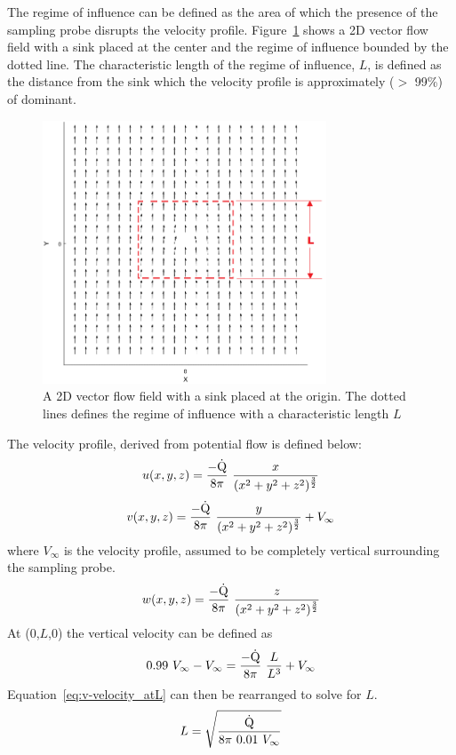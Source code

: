 \documentclass[12pt]{article}
\begin{document}
The regime of influence can be defined as the area of which the presence of the sampling probe disrupts the velocity profile. Figure~\ref{fig:Potential Flow} shows a 2D vector flow field with a sink placed at the center and the regime of influence bounded by the dotted line. The characteristic length of the regime of influence, $L$, is defined as the distance from the sink which the velocity profile is approximately ($>$ 99\%) of dominant.
\begin{figure}[h!]
	\centering
\includegraphics[width=8.45cm,keepaspectratio]{Potential_Flow.png}
	\caption{A 2D vector flow field with a sink placed at the origin. The dotted lines defines the regime of influence with a characteristic length $L$}
	\label{fig:Potential Flow}
\end{figure}

The velocity profile, derived from potential flow is defined below:
\begin{equation}
\label{eq:u-velocity}
u(x,y,z)=\frac{-\rm{\dot{Q}}}{8\pi}~\frac{x}{({x^2+y^2+z^2})^{\frac{3}{2}}}
\end{equation}
\begin{equation}
\label{eq:v-velocity}
v(x,y,z)=\frac{-\rm{\dot{Q}}}{8\pi}~\frac{y}{({x^2+y^2+z^2})^{\frac{3}{2}}}+V_{\infty}
\end{equation}
where $V_{\infty}$ is the velocity profile, assumed to be completely vertical surrounding the sampling probe. 
\begin{equation}
\label{eq:w-velocity}
w(x,y,z)=\frac{-\rm{\dot{Q}}}{8\pi}~\frac{z}{({x^2+y^2+z^2})^{\frac{3}{2}}}
\end{equation}
At (0,$L$,0) the vertical velocity can be defined as
\begin{equation}
\label{eq:v-velocity_atL}
0.99~V_{\infty}-V_{\infty}=\frac{-\rm{\dot{Q}}}{8\pi}~\frac{L}{L^3}+V_{\infty}
\end{equation}
Equation~\ref{eq:v-velocity_atL} can then be rearranged to solve for $L$.
\begin{equation}
\label{eq:char_length}
L=\sqrt{\frac{\rm{\dot{Q}}}{8\pi~0.01~V_{\infty}}}
\end{equation}
\end{document}
